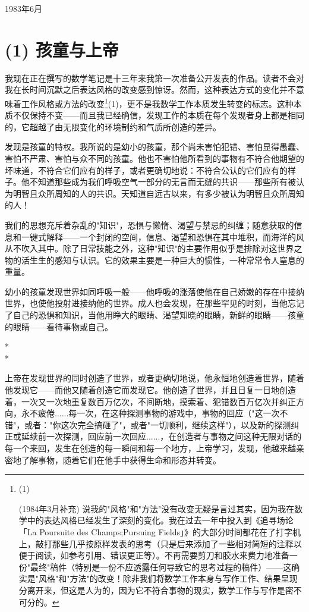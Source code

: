 1983年6月

\section{(1) 孩童与上帝}

我现在正在撰写的数学笔记是十三年来我第一次准备公开发表的作品。读者不会对我在长时间沉默之后表达风格的改变感到惊讶。然而，这种表达方式的变化并不意味着工作风格或方法的改变\footnote{(1)\par(1984年3月补充) 说我的"风格"和"方法"没有改变无疑是言过其实，因为我在数学中的表达风格已经发生了深刻的变化。我在过去一年中投入到《追寻场论「La Poursuite des Champs;Pursuing Fields」》的大部分时间都花在了打字机上，敲打那些几乎按原样发表的思考（只是后来添加了一些相对简短的注释以便于阅读，如参考引用、错误更正等）。不再需要剪刀和胶水来费力地准备一份"最终"稿件（特别是一份不应透露任何导致它的思考过程的稿件）——这确实是"风格"和"方法"的改变！除非我们将数学工作本身与写作工作、结果呈现分离开来，但这是人为的，因为它不符合事物的现实，数学工作与写作是密不可分的。}(1)，更不是我数学工作本质发生转变的标志。这种本质不仅保持不变——而且我已经确信，发现工作的本质在每个发现者身上都是相同的，它超越了由无限变化的环境制约和气质所创造的差异。

发现是孩童的特权。我所说的是幼小的孩童，那个尚未害怕犯错、害怕显得愚蠢、害怕不严肃、害怕与众不同的孩童。他也不害怕他所看到的事物有不符合他期望的坏味道，不符合它们应有的样子，或者更确切地说：不符合公认的它们应有的样子。他不知道那些成为我们呼吸空气一部分的无言而无缝的共识——那些所有被认为明智且众所周知的人的共识。天知道自远古以来，有多少被认为明智且众所周知的人！

我们的思想充斥着杂乱的"知识"，恐惧与懒惰、渴望与禁忌的纠缠；随意获取的信息和一键式解释——一个封闭的空间，信息、渴望和恐惧在其中堆积，而海洋的风从不吹入其中。除了日常技能之外，这种"知识"的主要作用似乎是排除对这世界之物的活生生的感知与认识。它的效果主要是一种巨大的惯性，一种常常令人窒息的重量。

幼小的孩童发现世界如同呼吸一般——他呼吸的涨落使他在自己娇嫩的存在中接纳世界，也使他投射进接纳他的世界。成人也会发现，在那些罕见的时刻，当他忘记了自己的恐惧和知识，当他用睁大的眼睛、渴望知晓的眼睛，新鲜的眼睛——孩童的眼睛——看待事物或自己。

\begin{center}
    * \quad * \\
    *
\end{center}

上帝在发现世界的同时创造了世界，或者更确切地说，他永恒地创造着世界，随着他发现它——而他又随着创造它而发现它。他创造了世界，并且日复一日地创造着，一次又一次地重复数百万亿次，不间断地，摸索着、犯错数百万亿次并纠正方向，永不疲倦......每一次，在这种探测事物的游戏中，事物的回应（"这一次不错"，或者："你这次完全搞砸了"，或者"一切顺利，继续这样"），以及新的探测纠正或延续前一次探测，回应前一次回应......，在创造者与事物之间这种无限对话的每一个来回，发生在创造的每一瞬间和每一个地方，上帝学习，发现，他越来越亲密地了解事物，随着它们在他手中获得生命和形态并转变。


